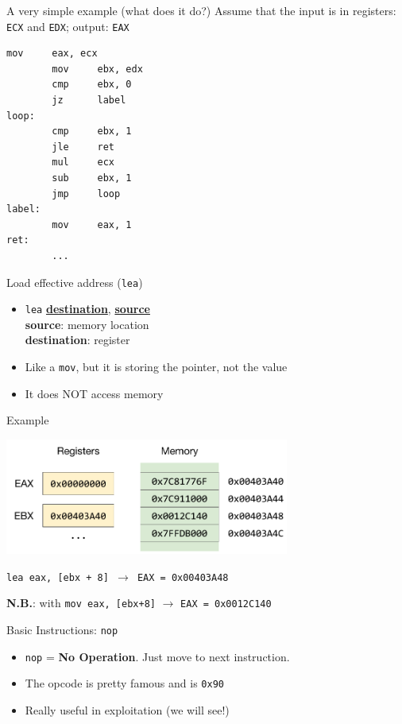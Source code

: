 \documentclass[]{beamer}
\begin{document}
\begin{frame}[fragile]{A very simple example (what does it do?)}
Assume that the input is in registers: {\tt ECX} and {\tt EDX}; output: {\tt EAX}
\begin{lstlisting}[language={[x86masm]Assembler}]
        mov     eax, ecx
        mov     ebx, edx
        cmp     ebx, 0
        jz      label
loop:
        cmp     ebx, 1
        jle     ret
        mul     ecx
        sub     ebx, 1
        jmp     loop
label:
        mov     eax, 1
ret:
        ...
\end{lstlisting}
\end{frame}

\begin{frame}{Load effective address ({\tt lea})}
  \begin{itemize}
  		\item{{\tt lea} \underline{\textbf{destination}}, \underline{\textbf{source}}}\\
  		\textbf{source}: memory location\\
    	\textbf{destination}: register\\
  		\item{Like a {\tt mov}, but it is storing the pointer, not the value}
  		\item \alert{It does NOT access memory}
  \end{itemize}

  \begin{block}{Example}
  \par\noindent{}
  \centerline{\includegraphics[width=0.7\textwidth]{images/x86-lea}}
  \centerline{\tt lea eax, [ebx + 8] $\rightarrow$ \texttt{EAX = 0x00403A48}}
  \centerline{\textbf{N.B.}: with {\tt mov eax, [ebx+8]} $\rightarrow$ {\tt EAX = 0x0012C140}}
   \end{block}
\end{frame}

\begin{frame}{Basic Instructions: {\tt nop}}
  \begin{itemize}
  \item{{\tt nop} = \textbf{No Operation}. Just move to next instruction.}
  \item{The opcode is pretty famous and is {\tt 0x90}}
  \item{Really useful in exploitation (we will see!)}
  \end{itemize}
\end{frame}
\end{document}
